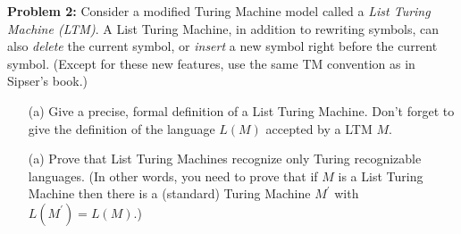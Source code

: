 
\noindent \textbf{Problem 2: } Consider a modified Turing Machine model called a \textit{List Turing Machine (LTM)}. A List Turing Machine, in addition to rewriting symbols, can also \textit{delete} the current symbol, or \textit{insert} a new symbol right before the current symbol. (Except for these new features, use the same TM convention as in Sipser's book.)

\begin{itemize}
    \item[(a)] Give a precise, formal definition of a List Turing Machine. Don’t forget to give the definition of the language $L(M)$ accepted by a LTM $M$.
    \item[(a)] Prove that List Turing Machines recognize only Turing recognizable languages. (In other words, you need to prove that if $M$ is a List Turing Machine then there is a (standard) Turing Machine $M^{'}$ with $L(M^{'}) = L(M).$)
\end{itemize}